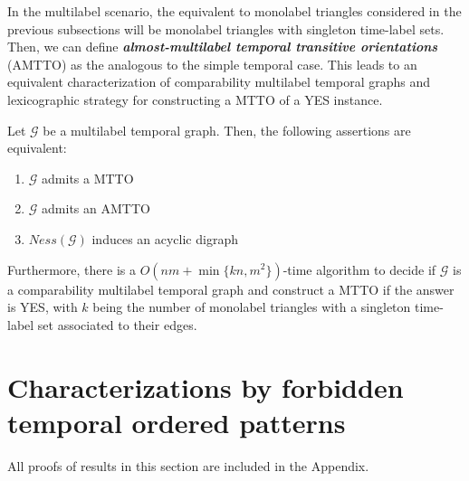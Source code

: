 \documentclass[runningheads]{llncs}
\newcommand{\bfit}[1]{\textbf{\textit{#1}}}
\begin{document}
In the multilabel scenario, the equivalent to monolabel triangles considered in the previous subsections will be monolabel triangles with singleton time-label sets. Then, we can define \bfit{almost-multilabel temporal transitive orientations} (AMTTO) as the analogous to the simple temporal case. This leads to an equivalent characterization of comparability multilabel temporal graphs and lexicographic strategy for constructing a MTTO of a YES instance.

\begin{theorem}
 Let $\mathcal{G}$ be a multilabel temporal graph. Then, the following assertions are equivalent:
\begin{enumerate}[label=\roman*)]
     \item $\mathcal{G}$ admits a MTTO
     \item $\mathcal{G}$ admits an AMTTO
     \item $Ness(\mathcal{G})$ induces an acyclic digraph
\end{enumerate}

Furthermore, there is a $O(nm + \min\{kn,m^2\})$-time algorithm to decide if $\mathcal{G}$ is a comparability multilabel temporal graph and construct a MTTO if the answer is YES, with $k$ being the number of monolabel triangles with a singleton time-label set associated to their edges.
\label{theo:mtto-gouila-houri-generalization}
\end{theorem}



\section{Characterizations by forbidden temporal ordered patterns}
\label{sect:patterns}

All proofs of results in this section are included in the Appendix.
\end{document}
